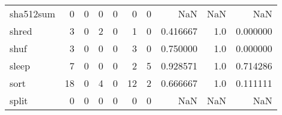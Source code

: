 \begin{longtable}{lrrrrrrrrr}
sha512sum &                                       0 &                                                  0 &                                                  0 &                                                  0 &                                                  0 &                                                  0 &                                                NaN &                                    NaN &                                  NaN \\
shred     &                                       3 &                                                  0 &                                                  2 &                                                  0 &                                                  1 &                                                  0 &                                           0.416667 &                                    1.0 &                             0.000000 \\
shuf      &                                       3 &                                                  0 &                                                  0 &                                                  0 &                                                  3 &                                                  0 &                                           0.750000 &                                    1.0 &                             0.000000 \\
sleep     &                                       7 &                                                  0 &                                                  0 &                                                  0 &                                                  2 &                                                  5 &                                           0.928571 &                                    1.0 &                             0.714286 \\
sort      &                                      18 &                                                  0 &                                                  4 &                                                  0 &                                                 12 &                                                  2 &                                           0.666667 &                                    1.0 &                             0.111111 \\
split     &                                       0 &                                                  0 &                                                  0 &                                                  0 &                                                  0 &                                                  0 &                                                NaN &                                    NaN &                                  NaN \\

\end{longtable}
